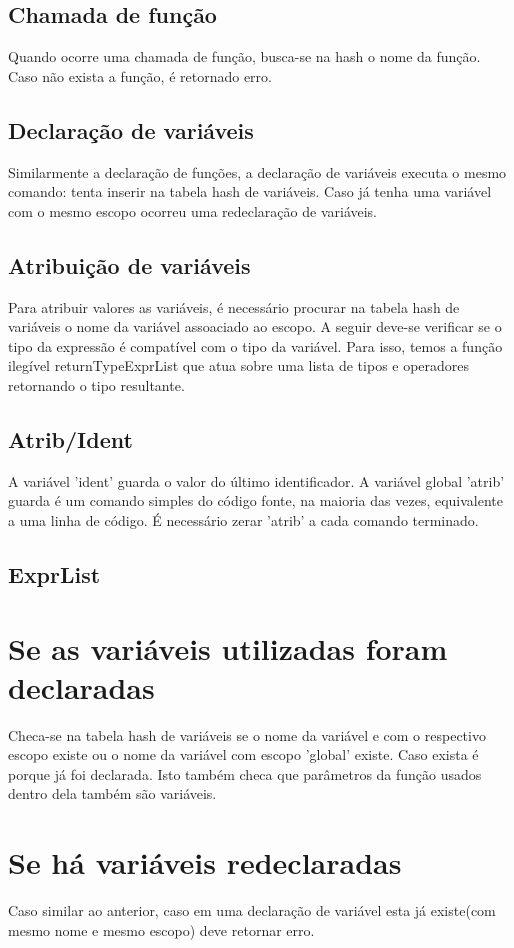 \documentclass[a4paper,10pt]{article}
\begin{document}
\subsection{Chamada de função}
Quando ocorre uma chamada de função, busca-se na hash o nome da função. Caso não exista a função, é retornado erro.
\subsection{Declaração de variáveis}
Similarmente a declaração de funções, a declaração de variáveis executa o mesmo comando: tenta inserir na tabela hash de variáveis. Caso já tenha uma variável com o mesmo escopo ocorreu uma
redeclaração de variáveis.
\subsection{Atribuição de variáveis}
Para atribuir valores as variáveis, é necessário procurar na tabela hash de variáveis o nome da variável assoaciado ao escopo. A seguir deve-se verificar se o tipo da expressão
é compatível com o tipo da variável. Para isso, temos a função ilegível returnTypeExprList que atua sobre uma lista de tipos e operadores retornando o tipo resultante.
\subsection{Atrib/Ident}
A variável 'ident' guarda o valor do último identificador. A variável global 'atrib' guarda é um comando simples do código fonte, na maioria das vezes, equivalente a uma linha de código.
É necessário zerar 'atrib' a cada comando terminado.
\subsection{ExprList}

\section{Se as variáveis utilizadas foram declaradas}
Checa-se na tabela hash de variáveis se o nome da variável e com o respectivo escopo existe ou o nome da variável com escopo 'global' existe. 
Caso exista é porque já foi declarada. Isto também checa que parâmetros da função usados dentro dela também são variáveis.

\section{Se há variáveis redeclaradas}
Caso similar ao anterior, caso em uma declaração de variável esta já existe(com mesmo nome e mesmo escopo) deve retornar erro.
\end{document}
